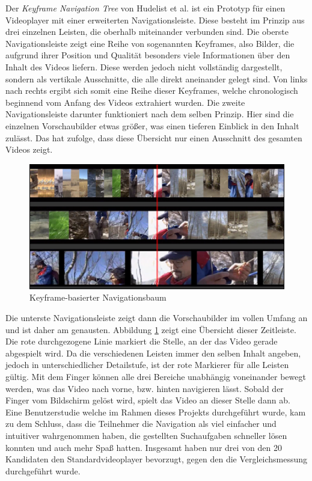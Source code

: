 \documentclass[11pt,a4paper]{report}
\begin{document}
Der \emph{Keyframe Navigation Tree} von Hudelist et al. \cite{hudelist2015improving} ist ein Prototyp für einen Videoplayer mit einer erweiterten Navigationsleiste. Diese besteht im Prinzip aus drei einzelnen Leisten, die oberhalb miteinander verbunden sind. Die oberste Navigationsleiste zeigt eine Reihe von sogenannten Keyframes, also Bilder, die aufgrund ihrer Position und Qualität besonders viele Informationen über den Inhalt des Videos liefern. Diese werden jedoch nicht vollständig dargestellt, sondern als vertikale Ausschnitte, die alle direkt aneinander gelegt sind. Von links nach rechts ergibt sich somit eine Reihe dieser Keyframes, welche chronologisch beginnend vom Anfang des Videos extrahiert wurden. Die zweite Navigationsleiste darunter funktioniert nach dem selben Prinzip. Hier sind die einzelnen Vorschaubilder etwas größer, was einen tieferen Einblick in den Inhalt zulässt. Das hat zufolge, dass diese Übersicht nur einen Ausschnitt des gesamten Videos zeigt.
\begin{figure}[h]
\begin{center}
\includegraphics[scale=0.9]{./images/12.png}
\caption{Keyframe-basierter Navigationsbaum \cite{hudelist2015improving}}
\label{keyframe_tree}
\end{center}
\end{figure}
Die unterste Navigationsleiste zeigt dann die Vorschaubilder im vollen Umfang an und ist daher am genausten. Abbildung \ref{keyframe_tree} zeigt eine Übersicht dieser Zeitleiste. Die rote durchgezogene Linie markiert die Stelle, an der das Video gerade abgespielt wird. Da die verschiedenen Leisten immer den selben Inhalt angeben, jedoch in unterschiedlicher Detailstufe, ist der rote Markierer für alle Leisten gültig. Mit dem Finger können alle drei Bereiche unabhängig voneinander bewegt werden, was das Video nach vorne, bzw. hinten navigieren lässt. Sobald der Finger vom Bildschirm gelöst wird, spielt das Video an dieser Stelle dann ab. Eine Benutzerstudie welche im Rahmen dieses Projekts durchgeführt wurde, kam zu dem Schluss, dass die Teilnehmer die Navigation als viel einfacher und intuitiver wahrgenommen haben, die gestellten Suchaufgaben schneller lösen konnten und auch mehr Spaß hatten. Insgesamt haben nur drei von den 20 Kandidaten den Standardvideoplayer bevorzugt, gegen den die Vergleichsmessung durchgeführt wurde.
\end{document}
